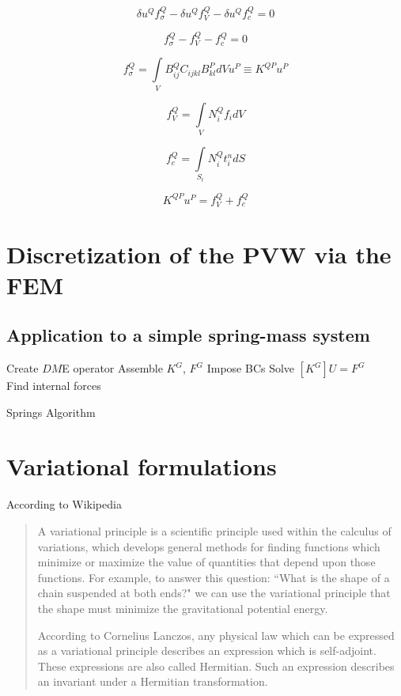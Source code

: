 \[\delta {u^Q}f_\sigma ^Q - \delta {u^Q}f_V^Q - \delta {u^Q}f_c^Q = 0\]

\[f_\sigma ^Q - f_V^Q - f_c^Q = 0\]

\[f_\sigma ^Q = \int\limits_V {B_{ij}^Q{C_{ijkl}}B_{kl}^PdV{u^P} \equiv {K^{QP}}} {u^P}\]

\[f_V^Q = \int\limits_V {N_i^Q{f_i}dV} \]

\[f_c^Q = \int\limits_{{S_t}} {N_i^Qt_i^ndS} \]

\[{K^{QP}}{u^P} = f_V^Q + f_c^Q\]

\section[Discretization of the PVW using FEM]{Discretization of the PVW via the FEM}

\subsection*{Application to a simple spring-mass system}


\begin{algorithm}[H]
 \SetAlgoLined
 Create $DM$E operator\;
 Assemble $K^G$, $F^G$\;
Impose BCs\;
Solve $[K^G]U=F^G$\\
Find internal forces
\caption{Springs Algorithm}
\end{algorithm}


\section{Variational formulations}
According to Wikipedia \cite{wiki:variational_principle}

\begin{quotation}
A variational principle is a scientific principle used within the calculus of variations, which develops general methods for finding functions which minimize or maximize the value of quantities that depend upon those functions. For example, to answer this question: ``What is the shape of a chain suspended at both ends?" we can use the variational principle that the shape must minimize the gravitational potential energy.

According to Cornelius Lanczos, any physical law which can be expressed as a variational principle describes an expression which is self-adjoint. These expressions are also called Hermitian. Such an expression describes an invariant under a Hermitian transformation.
\end{quotation}

